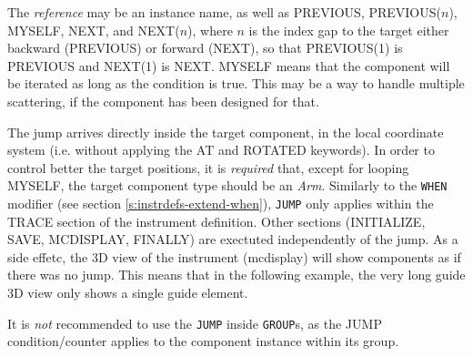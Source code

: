 The \textit{reference} may be an instance name, as well as PREVIOUS, PREVIOUS($n$), MYSELF, NEXT, and NEXT($n$), where $n$ is the index gap to the target either backward (PREVIOUS) or forward (NEXT), so that PREVIOUS(1) is PREVIOUS and NEXT(1) is NEXT. MYSELF means that the component will be iterated as long as the condition is true. This may be a way to handle multiple scattering, if the component has been designed for that.

The jump arrives directly inside the target component, in the local coordinate system (i.e. without applying the AT and ROTATED keywords). In order to control better the target positions, it is \emph{required} that, except for looping MYSELF, the target component type should be an \emph{Arm}.
%
%
%
%
%
%
Similarly to the \texttt{WHEN} modifier (see section \ref{s:instrdefs-extend-when}), \texttt{JUMP} only applies within the TRACE section of the instrument definition. Other sections (INITIALIZE, SAVE, MCDISPLAY, FINALLY) are exectuted independently of the jump. As a side effetc, the 3D view of the instrument (mcdisplay) will show components as if there was no jump. This means that in the following example, the very long guide 3D view only shows a single guide element.

It is \emph{not} recommended to use the \verb+JUMP+ inside \verb+GROUP+s, as the JUMP condition/counter applies to the component instance within its group.

